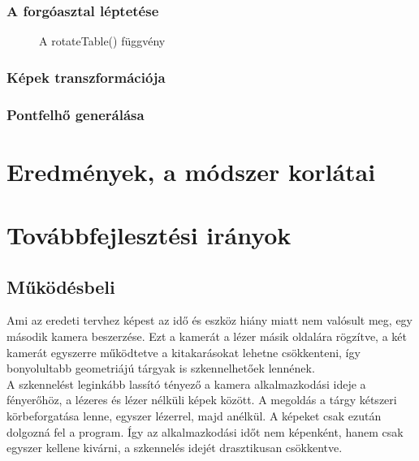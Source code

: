 \documentclass[12pt,a4paper]{article}
\begin{document}
\subsubsection{A forgóasztal léptetése}


\begin{figure}
\centering

\caption{A rotateTable() függvény}
\end{figure}

\subsubsection{Képek transzformációja}
\subsubsection{Pontfelhő generálása}
\section{Eredmények, a módszer korlátai}
\section{Továbbfejlesztési irányok}
\subsection{Működésbeli}
Ami az eredeti tervhez képest az idő és eszköz hiány miatt nem valósult meg, egy második kamera beszerzése. Ezt a kamerát a lézer másik oldalára rögzítve, a két kamerát egyszerre működtetve a kitakarásokat lehetne csökkenteni, így bonyolultabb geometriájú tárgyak is szkennelhetőek lennének.
\\[10pt]
A szkennelést leginkább lassító tényező a kamera alkalmazkodási ideje a fényerőhöz, a lézeres és lézer nélküli képek között. A megoldás a tárgy kétszeri körbeforgatása lenne, egyszer lézerrel, majd anélkül. A képeket csak ezután dolgozná fel a program. Így az alkalmazkodási időt nem képenként, hanem csak egyszer kellene kivárni, a szkennelés idejét drasztikusan csökkentve.
\end{document}
